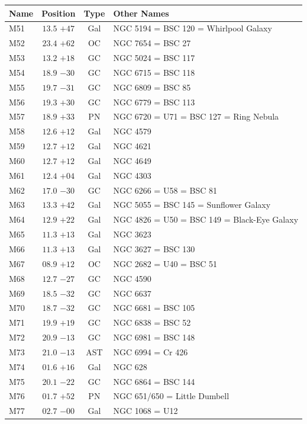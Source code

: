 \begin{table}[t]
    \setlength{\tabcolsep}{2pt}
    \footnotesize
    \begin{tabularx}{\linewidth}{lccX}
        \hline
        Name&Position&Type&Other Names\\
        \hline

M51  &$13.5$ $+47$&Gal&NGC 5194 = BSC 120 = Whirlpool Galaxy\\
M52  &$23.4$ $+62$&OC &NGC 7654 = BSC 27\\
M53  &$13.2$ $+18$&GC &NGC 5024 = BSC 117\\
M54  &$18.9$ $-30$&GC &NGC 6715 = BSC 118\\
M55  &$19.7$ $-31$&GC &NGC 6809 = BSC 85\\
M56  &$19.3$ $+30$&GC &NGC 6779 = BSC 113\\
M57  &$18.9$ $+33$&PN &NGC 6720 = U71 = BSC 127 = Ring Nebula\\
M58  &$12.6$ $+12$&Gal&NGC 4579\\
M59  &$12.7$ $+12$&Gal&NGC 4621\\
M60  &$12.7$ $+12$&Gal&NGC 4649\\
M61  &$12.4$ $+04$&Gal&NGC 4303\\
M62  &$17.0$ $-30$&GC &NGC 6266 = U58 = BSC 81\\
M63  &$13.3$ $+42$&Gal&NGC 5055 = BSC 145 = Sunflower Galaxy\\
M64  &$12.9$ $+22$&Gal&NGC 4826 = U50 = BSC 149 = Black-Eye Galaxy\\
M65  &$11.3$ $+13$&Gal&NGC 3623\\
M66  &$11.3$ $+13$&Gal&NGC 3627 = BSC 130\\
M67  &$08.9$ $+12$&OC &NGC 2682 = U40 = BSC 51\\
M68  &$12.7$ $-27$&GC &NGC 4590\\
M69  &$18.5$ $-32$&GC &NGC 6637\\
M70  &$18.7$ $-32$&GC &NGC 6681 = BSC 105\\
M71  &$19.9$ $+19$&GC &NGC 6838 = BSC 52\\
M72  &$20.9$ $-13$&GC &NGC 6981 = BSC 148\\
M73  &$21.0$ $-13$&AST&NGC 6994 = Cr 426\\
M74  &$01.6$ $+16$&Gal&NGC 628\\
M75  &$20.1$ $-22$&GC &NGC 6864 = BSC 144\\
M76  &$01.7$ $+52$&PN &NGC 651/650 = Little Dumbell\\
M77  &$02.7$ $-00$&Gal&NGC 1068 = U12\\

\end{tabularx}
\end{table}
